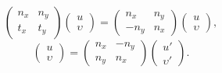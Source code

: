 \documentclass[review]{elsarticle}
\begin{document}
\begin{enumerate}
\begin{equation}
	\left(\begin{array}{cc}
	n_x & n_y \\
	t_x & t_y
	\end{array} \right) \left(\begin{array}{c} u \\ \upsilon \end{array} \right) = 	\left(\begin{array}{cc}
	n_x & n_y \\
	-n_y & n_x
	\end{array} \right) \left(\begin{array}{c} u \\ \upsilon \end{array} \right),
	\end{equation}
	\begin{equation}\label{TVector:2}
	\left(\begin{array}{c} u \\ \upsilon  \end{array} \right) = 
	\left(\begin{array}{cc}
	n_x & -n_y \\
	n_y & n_x
	\end{array} \right) \left(\begin{array}{c} u' \\ \upsilon{'} \end{array} \right).
	\end{equation}
	

\end{enumerate}
\end{document}
